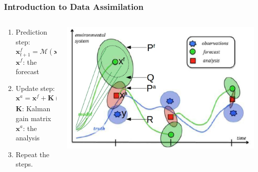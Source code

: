 \documentclass{beamer}
\newcommand{\mx}{\textbf{x}}
\newcommand{\my}{\textbf{y}}
\newcommand{\mK}{\textbf{K}}
\newcommand{\cH}{\mathcal{H}}
\newcommand{\cM}{\mathcal{M}}
\begin{document}
\begin{frame}
\frametitle{Introduction to Data Assimilation}
\begin{columns}
\begin{column}{0.4\textwidth}
	\begin{enumerate}
		\item Prediction step: $\mx_{t+1}^f=\cM(\mx_t^a)$ \\ 
				$\mx^f$: the forecast
		\item Update step: $\mx^a=\mx^f + \mK(\my - \cH(\mx^f))$\\ $\mK$: Kalman gain matrix \\
				$\mx^a$: the analysis
		\item Repeat the steps.
	\end{enumerate}
\end{column}
\begin{column}{0.6\textwidth} 
    \begin{center}
    \includegraphics[width=\linewidth]{Figures/DAVisualization.png}
    \end{center}
\end{column}
\end{columns}
\end{frame}
\end{document}
